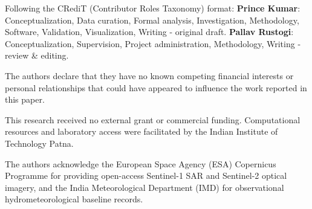 \documentclass[OA,linenum]{InterPore}
\begin{document}
\begin{bmsec}
Following the CRediT (Contributor Roles Taxonomy) format:
\textbf{Prince Kumar}: Conceptualization, Data curation, Formal analysis, Investigation, Methodology, Software, Validation, Visualization, Writing - original draft.
\textbf{Pallav Rustogi}: Conceptualization, Supervision, Project administration, Methodology, Writing - review \& editing.
\end{bmsec}

\begin{bmsec}
The authors declare that they have no known competing financial interests or personal relationships that could have appeared to influence the work reported in this paper.
\end{bmsec}

\begin{bmsec}
This research received no external grant or commercial funding. Computational resources and laboratory access were facilitated by the Indian Institute of Technology Patna.
\end{bmsec}

\begin{ack}
The authors acknowledge the European Space Agency (ESA) Copernicus Programme for providing open-access Sentinel-1 SAR and Sentinel-2 optical imagery, and the India Meteorological Department (IMD) for observational hydrometeorological baseline records.
\end{ack}

\begin{orcaulist}
\end{orcaulist}




\end{document}
